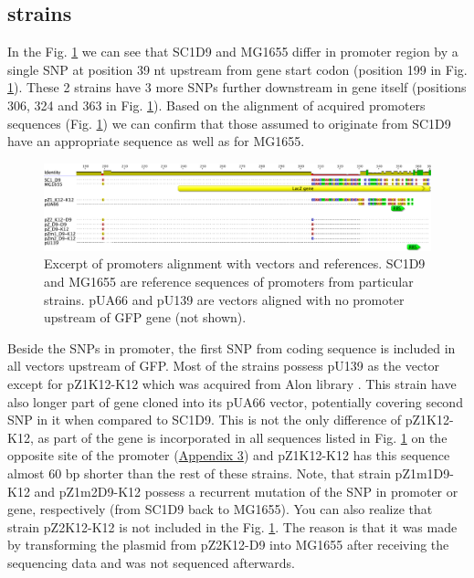 \hypertarget{SeqRes}{\subsection{ strains}}
In the Fig. \ref{placZ} we can see that SC1\textunderscore D9 and MG1655 differ in  promoter region by a single SNP at position 39 nt upstream from  gene start codon (position 199 in Fig. \ref{placZ}).
These 2 strains have 3 more SNPs further downstream in  gene itself 
(positions 306, 324 and 363 in Fig. \ref{placZ}).
Based on the alignment of acquired  promoters sequences (Fig. \ref{placZ}) we can confirm that those assumed to originate from SC1\textunderscore D9 have an appropriate sequence as well as for MG1655.
\begin{figure}[ht]
  \centering
  \includegraphics[scale=0.25]{text/Pictures/placZsequences.png}
	\caption{Excerpt of  promoters alignment with vectors and references. SC1\textunderscore D9 and MG1655 are reference sequences of  promoters from particular strains. pUA66 and pU139 are vectors aligned with no promoter upstream of GFP gene (not shown).}
	\label{placZ}
\end{figure}
Beside the SNPs in  promoter, the first SNP from  coding sequence is included in all vectors upstream of GFP.
Most of the strains possess pU139 as the vector except for pZ1\textunderscore K12-K12 which was acquired from Alon library \cite{zaslaver2006comprehensive}.
This strain have also longer part of  gene cloned into its pUA66 vector, potentially covering second SNP in it when compared to SC1\textunderscore D9.
This is not the only difference of pZ1\textunderscore K12-K12, as part of the  gene is incorporated in all sequences listed in Fig. \ref{placZ} on the opposite site of the promoter (\hyperlink{placZalign}{Appendix 3}) and pZ1\textunderscore K12-K12 has this  sequence almost 60 bp shorter than the rest of these strains.
Note, that strain pZ1m1\textunderscore D9-K12 and pZ1m2\textunderscore D9-K12 possess a recurrent mutation of the SNP in  promoter or  gene, respectively (from SC1\textunderscore D9 back to MG1655).
You can also realize that strain pZ2\textunderscore K12-K12 is not included in the Fig. \ref{placZ}.
The reason is that it was made by transforming the plasmid from pZ2\textunderscore K12-D9 into MG1655 after receiving the sequencing data and was not sequenced afterwards.


